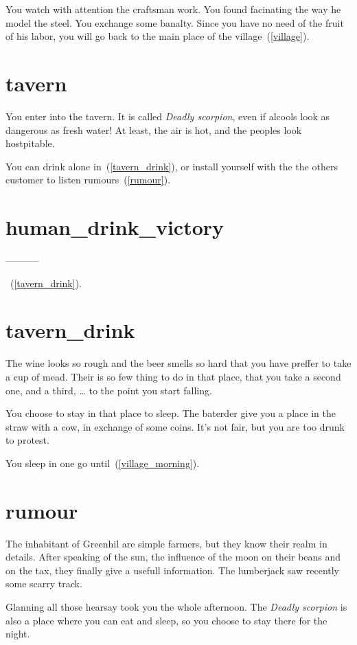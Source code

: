 You watch with attention the craftsman work. You found facinating the way he
model the steel. You exchange some banalty. Since you have no need of the fruit
of his labor, you will go back to the main place of the village~(\ref{village}).

\section{tavern}

You enter into the tavern. It is called \textit{Deadly scorpion}, even if
alcools look as dangerous as fresh water! At least, the air is hot, and the
peoples look hostpitable.

You can drink alone in~(\ref{tavern_drink}), or install yourself with the
the others customer to listen rumours~(\ref{rumour}).

\section{human_drink_victory}

-----------

~(\ref{tavern_drink}).

\section{tavern_drink}

The wine looks so rough and the beer smells so hard that you have preffer to
take a cup of mead. Their is so few thing to do in that place, that you take a
second one, and a third, … to the point you start falling.

You choose to stay in that place to sleep. The baterder give you a place in the
straw with a cow, in exchange of some coins. It's not fair, but you are too drunk
to protest.

You sleep in one go until~(\ref{village_morning}).

\section{rumour}

The inhabitant of Greenhil are simple farmers, but they know their realm in
details. After speaking of the sun, the influence of the moon on their beans and
on the tax, they finally give a usefull information. The lumberjack saw
recently some scarry track.

Glanning all those hearsay took you the whole afternoon. The \textit{Deadly
scorpion} is also a place where you can eat and sleep, so you choose to stay
there for the night.

